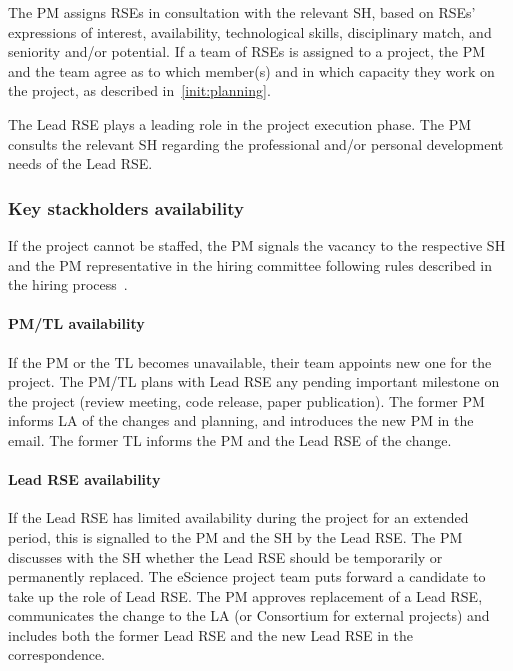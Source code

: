 The PM assigns RSEs in consultation with the
relevant SH, based on RSEs' expressions of interest, availability, technological skills, 
disciplinary match, and seniority and/or potential. 
%
If a team of RSEs is assigned to a project, the PM and the team agree as to which member(s) and in
which capacity they work on the project, as described in~\ref{init:planning}. %

The Lead RSE plays a leading role in the project execution phase. The PM consults the relevant SH regarding the
professional and/or personal development needs of the Lead RSE.


\subsubsection{Key stackholders availability}

If %
the project cannot be staffed, the PM signals the vacancy to the respective
SH and the PM representative in the hiring committee following rules described in the hiring process~\cite{intranet}.

\paragraph{PM/TL availability} If the PM or the TL becomes unavailable, their team appoints new one for the project.
The PM/TL plans with Lead RSE any pending important milestone on the project (review meeting, code release, paper publication).
The former PM informs LA of the changes and planning, and introduces the new PM in the email. The former TL informs the PM and the Lead RSE of the change.

\paragraph{Lead RSE availability}
If the Lead RSE has limited availability during the project for an extended period, this is signalled to the PM and the
SH by the Lead RSE. The PM discusses with the SH whether the Lead RSE should be temporarily or permanently replaced.
The eScience project team puts forward a candidate to take up the role of Lead RSE. The PM approves replacement of a Lead RSE, 
communicates the change to the LA (or Consortium for external projects) and includes both the former Lead RSE and the
new Lead RSE in the correspondence.

